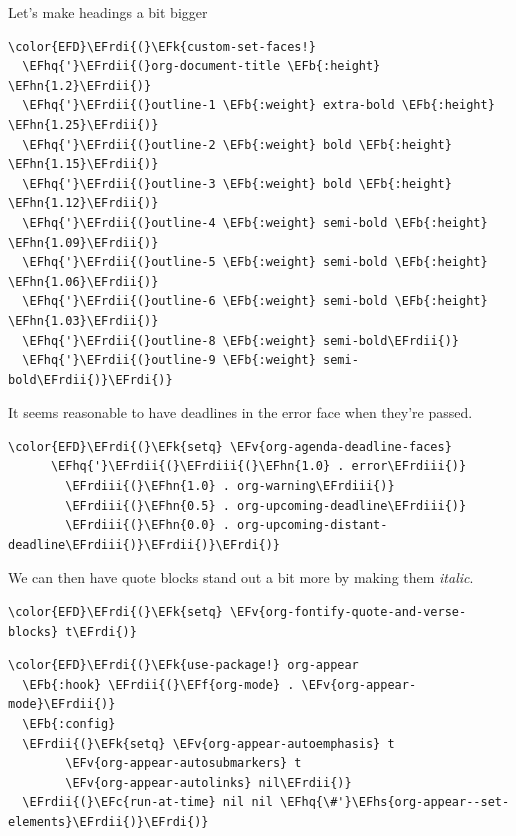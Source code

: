 \documentclass{scrartcl}
\newcommand{\EFk}[1]{\textcolor{EFk}{#1}} %
\newcommand{\EFb}[1]{\textcolor{EFb}{#1}} %
\newcommand{\EFc}[1]{\textcolor{EFc}{#1}} %
\newcommand{\EFv}[1]{\textcolor{EFv}{#1}} %
\newcommand{\EFf}[1]{\textcolor{EFf}{#1}} %
\newcommand{\EFhn}[1]{#1} %
\newcommand{\EFhq}[1]{#1} %
\newcommand{\EFhs}[1]{#1} %
\newcommand{\EFrdi}[1]{#1} %
\newcommand{\EFrdii}[1]{#1} %
\newcommand{\EFrdiii}[1]{#1} %
\begin{document}
Let's make headings a bit bigger
\begin{Code}
\begin{Verbatim}[]
\color{EFD}\EFrdi{(}\EFk{custom-set-faces!}
  \EFhq{'}\EFrdii{(}org-document-title \EFb{:height} \EFhn{1.2}\EFrdii{)}
  \EFhq{'}\EFrdii{(}outline-1 \EFb{:weight} extra-bold \EFb{:height} \EFhn{1.25}\EFrdii{)}
  \EFhq{'}\EFrdii{(}outline-2 \EFb{:weight} bold \EFb{:height} \EFhn{1.15}\EFrdii{)}
  \EFhq{'}\EFrdii{(}outline-3 \EFb{:weight} bold \EFb{:height} \EFhn{1.12}\EFrdii{)}
  \EFhq{'}\EFrdii{(}outline-4 \EFb{:weight} semi-bold \EFb{:height} \EFhn{1.09}\EFrdii{)}
  \EFhq{'}\EFrdii{(}outline-5 \EFb{:weight} semi-bold \EFb{:height} \EFhn{1.06}\EFrdii{)}
  \EFhq{'}\EFrdii{(}outline-6 \EFb{:weight} semi-bold \EFb{:height} \EFhn{1.03}\EFrdii{)}
  \EFhq{'}\EFrdii{(}outline-8 \EFb{:weight} semi-bold\EFrdii{)}
  \EFhq{'}\EFrdii{(}outline-9 \EFb{:weight} semi-bold\EFrdii{)}\EFrdi{)}
\end{Verbatim}
\end{Code}

It seems reasonable to have deadlines in the error face when they're passed.
\begin{Code}
\begin{Verbatim}[]
\color{EFD}\EFrdi{(}\EFk{setq} \EFv{org-agenda-deadline-faces}
      \EFhq{'}\EFrdii{(}\EFrdiii{(}\EFhn{1.0} . error\EFrdiii{)}
        \EFrdiii{(}\EFhn{1.0} . org-warning\EFrdiii{)}
        \EFrdiii{(}\EFhn{0.5} . org-upcoming-deadline\EFrdiii{)}
        \EFrdiii{(}\EFhn{0.0} . org-upcoming-distant-deadline\EFrdiii{)}\EFrdii{)}\EFrdi{)}
\end{Verbatim}
\end{Code}

We can then have quote blocks stand out a bit more by making them \emph{italic}.
\begin{Code}
\begin{Verbatim}[]
\color{EFD}\EFrdi{(}\EFk{setq} \EFv{org-fontify-quote-and-verse-blocks} t\EFrdi{)}
\end{Verbatim}
\end{Code}

\begin{Code}
\begin{Verbatim}[]
\color{EFD}\EFrdi{(}\EFk{use-package!} org-appear
  \EFb{:hook} \EFrdii{(}\EFf{org-mode} . \EFv{org-appear-mode}\EFrdii{)}
  \EFb{:config}
  \EFrdii{(}\EFk{setq} \EFv{org-appear-autoemphasis} t
        \EFv{org-appear-autosubmarkers} t
        \EFv{org-appear-autolinks} nil\EFrdii{)}
  \EFrdii{(}\EFc{run-at-time} nil nil \EFhq{\#'}\EFhs{org-appear--set-elements}\EFrdii{)}\EFrdi{)}
\end{Verbatim}
\end{Code}
\end{document}
